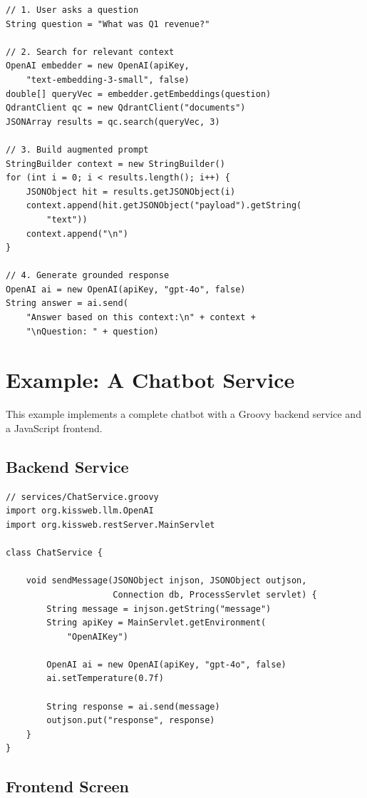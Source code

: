 \begin{lstlisting}[style=groovy]
// 1. User asks a question
String question = "What was Q1 revenue?"

// 2. Search for relevant context
OpenAI embedder = new OpenAI(apiKey,
    "text-embedding-3-small", false)
double[] queryVec = embedder.getEmbeddings(question)
QdrantClient qc = new QdrantClient("documents")
JSONArray results = qc.search(queryVec, 3)

// 3. Build augmented prompt
StringBuilder context = new StringBuilder()
for (int i = 0; i < results.length(); i++) {
    JSONObject hit = results.getJSONObject(i)
    context.append(hit.getJSONObject("payload").getString(
        "text"))
    context.append("\n")
}

// 4. Generate grounded response
OpenAI ai = new OpenAI(apiKey, "gpt-4o", false)
String answer = ai.send(
    "Answer based on this context:\n" + context +
    "\nQuestion: " + question)
\end{lstlisting}

\section{Example: A Chatbot Service}
\label{sec:llm-example}

This example implements a complete chatbot with a Groovy backend service and a JavaScript frontend.

\subsection{Backend Service}

\begin{lstlisting}[style=groovy]
// services/ChatService.groovy
import org.kissweb.llm.OpenAI
import org.kissweb.restServer.MainServlet

class ChatService {

    void sendMessage(JSONObject injson, JSONObject outjson,
                     Connection db, ProcessServlet servlet) {
        String message = injson.getString("message")
        String apiKey = MainServlet.getEnvironment(
            "OpenAIKey")

        OpenAI ai = new OpenAI(apiKey, "gpt-4o", false)
        ai.setTemperature(0.7f)

        String response = ai.send(message)
        outjson.put("response", response)
    }
}
\end{lstlisting}

\subsection{Frontend Screen}

